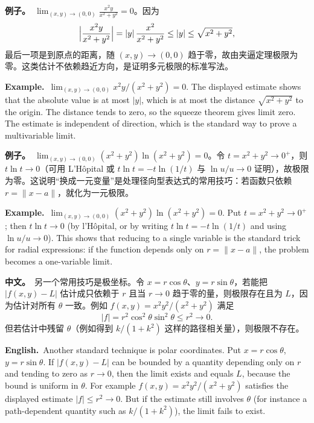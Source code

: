 \documentclass[UTF8,11pt,a4paper]{ctexart}
\newcommand{\BOTH}[2]{\par\noindent\textbf{中文。}\ #1\par\noindent\textbf{English.}\ #2\par}
\newcommand{\EX}[2]{\par\noindent\textbf{例子。}\ #1\par\noindent\textbf{Example.}\ #2\par}
\begin{document}
\EX{$\displaystyle\lim_{(x,y)\to(0,0)}\frac{x^2y}{x^2+y^2}=0$。因为
\[
\Bigl|\frac{x^2y}{x^2+y^2}\Bigr|=|y|\,\frac{x^2}{x^2+y^2}\le|y|\le\sqrt{x^2+y^2},
\]
最后一项是到原点的距离，随 $(x,y)\to(0,0)$ 趋于零，故由夹逼定理极限为零。这类估计不依赖趋近方向，是证明多元极限的标准写法。}{$\lim_{(x,y)\to(0,0)}x^2y/(x^2+y^2)=0$. The displayed estimate shows that the absolute value is at most $|y|$, which is at most the distance $\sqrt{x^2+y^2}$ to the origin. The distance tends to zero, so the squeeze theorem gives limit zero. The estimate is independent of direction, which is the standard way to prove a multivariable limit.}
\EX{$\displaystyle\lim_{(x,y)\to(0,0)}(x^2+y^2)\ln(x^2+y^2)=0$。令 $t=x^2+y^2\to0^+$，则 $t\ln t\to0$（可用 L'H\^opital 或 $t\ln t=-t\ln(1/t)$ 与 $\ln u/u\to0$ 证明），故极限为零。这说明“换成一元变量”是处理径向型表达式的常用技巧：若函数只依赖 $r=\|x-a\|$，就化为一元极限。}{$\lim_{(x,y)\to(0,0)}(x^2+y^2)\ln(x^2+y^2)=0$. Put $t=x^2+y^2\to0^+$; then $t\ln t\to0$ (by l'H\^opital, or by writing $t\ln t=-t\ln(1/t)$ and using $\ln u/u\to0$). This shows that reducing to a single variable is the standard trick for radial expressions: if the function depends only on $r=\|x-a\|$, the problem becomes a one-variable limit.}
\BOTH{另一个常用技巧是极坐标。令 $x=r\cos\theta$、$y=r\sin\theta$，若能把 $|f(x,y)-L|$ 估计成只依赖于 $r$ 且当 $r\to0$ 趋于零的量，则极限存在且为 $L$，因为估计对所有 $\theta$ 一致。例如 $f(x,y)=x^2y^2/(x^2+y^2)$ 满足
\[
|f|=r^2\cos^2\theta\sin^2\theta\le r^2\to0 .
\]
但若估计中残留 $\theta$（例如得到 $k/(1+k^2)$ 这样的路径相关量），则极限不存在。}{Another standard technique is polar coordinates. Put $x=r\cos\theta$, $y=r\sin\theta$. If $|f(x,y)-L|$ can be bounded by a quantity depending only on $r$ and tending to zero as $r\to0$, then the limit exists and equals $L$, because the bound is uniform in $\theta$. For example $f(x,y)=x^2y^2/(x^2+y^2)$ satisfies the displayed estimate $|f|\le r^2\to0$. But if the estimate still involves $\theta$ (for instance a path-dependent quantity such as $k/(1+k^2)$), the limit fails to exist.}
\end{document}

